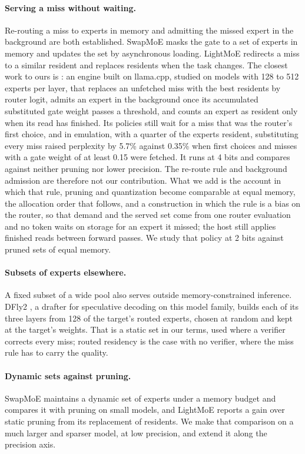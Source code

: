 \documentclass[11pt]{article}
\begin{document}
\paragraph{Serving a miss without waiting.} Re-routing a miss to experts in memory and admitting
the missed expert in the background are both established. SwapMoE \citep{kong2023swapmoe} masks
the gate to a set of experts in memory and updates the set by asynchronous loading. LightMoE
\citep{luo2026lightmoe} redirects a miss to a similar resident and replaces residents when the
task changes. The closest work to ours is \citet{son2026misses}: an engine built on llama.cpp,
studied on models with 128 to 512 experts per layer, that replaces an unfetched miss with the
best residents by router logit, admits an expert in the background once its accumulated
substituted gate weight passes a threshold, and counts an expert as resident only when its read
has finished. Its policies still wait for a miss that was the router's first choice, and in
emulation, with a quarter of the experts resident, substituting every miss raised perplexity by
5.7\% against 0.35\% when first choices and misses with a gate weight of at least 0.15 were
fetched. It
runs at 4 bits and compares against neither pruning nor lower precision. The re-route rule and
background admission are therefore not our contribution. What we add is the account in which
that rule, pruning and quantization become comparable at equal memory, the allocation order
that follows, and a construction in which the rule is a bias on the router, so that demand and
the served set come from one router evaluation and no token waits on storage for an expert it
missed; the host still applies finished reads between forward passes. We study that policy at 2 bits against pruned sets of equal memory.

\paragraph{Subsets of experts elsewhere.} A fixed subset of a wide pool also serves outside memory-constrained inference. DFly2 \citep{liu2026dfly2}, a drafter for speculative decoding on this model family, builds each of its three layers from 128 of the target's routed experts, chosen at random and kept at the target's weights. That is a static set in our terms, used where a verifier corrects every miss; routed residency is the case with no verifier, where the miss rule has to carry the quality.

\paragraph{Dynamic sets against pruning.} SwapMoE \citep{kong2023swapmoe} maintains a dynamic
set of experts under a memory budget and compares it with pruning on small models, and LightMoE
\citep{luo2026lightmoe} reports a gain over static pruning from its replacement of residents. We make
that comparison on a much larger and sparser model, at low precision, and extend it along the
precision axis.
\end{document}
